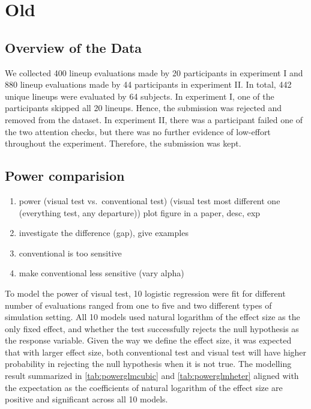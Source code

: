 \documentclass[]{interact}
\theoremstyle{plain}%
\theoremstyle{definition}
\theoremstyle{remark}
\def\tightlist{}
\begin{document}
\hypertarget{old}{%
\section{Old}\label{old}}

\hypertarget{overview-of-the-data}{%
\subsection{Overview of the Data}\label{overview-of-the-data}}

We collected 400 lineup evaluations made by 20 participants in
experiment I and 880 lineup evaluations made by 44 participants in
experiment II. In total, 442 unique lineups were evaluated by 64
subjects. In experiment I, one of the participants skipped all 20
lineups. Hence, the submission was rejected and removed from the
dataset. In experiment II, there was a participant failed one of the two
attention checks, but there was no further evidence of low-effort
throughout the experiment. Therefore, the submission was kept.

\hypertarget{power-comparision}{%
\subsection{Power comparision}\label{power-comparision}}

\begin{enumerate}
\def\labelenumi{\arabic{enumi}.}
\tightlist
\item
  power (visual test vs.~conventional test) (visual test most different
  one (everything test, any departure)) plot figure in a paper, desc,
  exp
\item
  investigate the difference (gap), give examples
\item
  conventional is too sensitive
\item
  make conventional less sensitive (vary alpha)
\end{enumerate}

To model the power of visual test, 10 logistic regression were fit for
different number of evaluations ranged from one to five and two
different types of simulation setting. All 10 models used natural
logarithm of the effect size as the only fixed effect, and whether the
test successfully rejects the null hypothesis as the response variable.
Given the way we define the effect size, it was expected that with
larger effect size, both conventional test and visual test will have
higher probability in rejecting the null hypothesis when it is not true.
The modelling result summarized in \ref{tab:powerglmcubic} and
\ref{tab:powerglmheter} aligned with the expectation as the coefficients
of natural logarithm of the effect size are positive and significant
across all 10 models.
\end{document}
